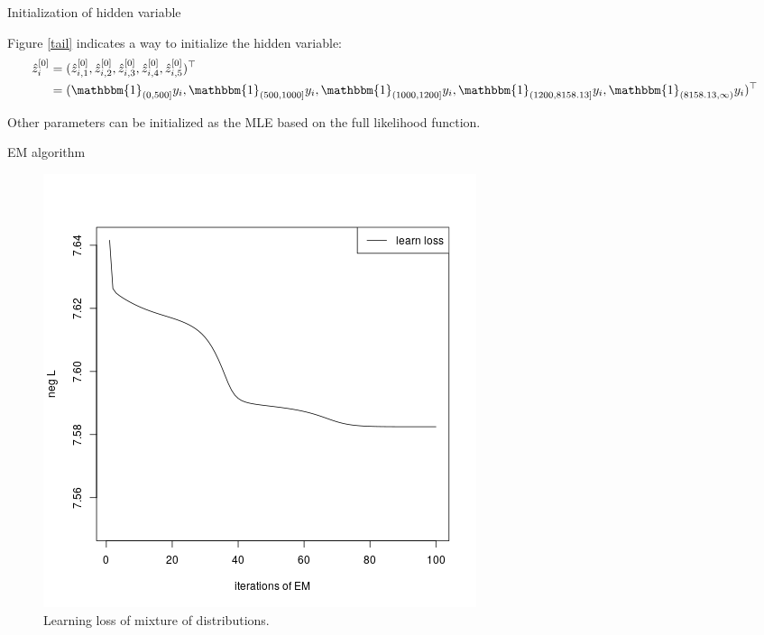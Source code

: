 \documentclass[11pt]{article}
\numberwithin{equation}{section}
\begin{document}
\begin{frame}{Initialization of hidden variable}
	
	Figure \ref{tail} indicates a way to initialize the hidden variable:
	\begin{equation}
		\begin{aligned}
			\hat{z}^{[0]}_i&=(\hat{z}^{[0]}_{i,1},\hat{z}^{[0]}_{i,2},\hat{z}^{[0]}_{i,3},\hat{z}^{[0]}_{i,4},\hat{z}^{[0]}_{i,5})^\top\\
			&=(\mathbbm{1}_{(0,500]}y_i,\mathbbm{1}_{(500, 1000]}y_i,\mathbbm{1}_{(1000,1200]}y_i,\mathbbm{1}_{(1200,8158.13]}y_i,\mathbbm{1}_{(8158.13,\infty)}y_i)^\top
		\end{aligned}
	\end{equation}
	
	Other parameters can be initialized as the MLE based on the full likelihood function.
	
\end{frame}


\begin{frame}{EM algorithm}
	\begin{figure}[h!]
		\centering
		\includegraphics[width=0.35\linewidth]{../plots/sev/null_trace}
		\caption{Learning loss of mixture of distributions.}\label{null_sev}
	\end{figure}
\end{frame}
\end{document}
